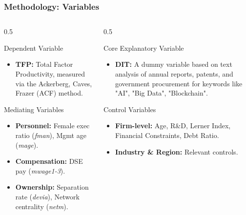 \documentclass[aspectratio=169]{beamer}
\begin{document}
\begin{frame}
  \frametitle{Methodology: Variables}
    \begin{columns}[T]
        \begin{column}{0.5\textwidth}
            \begin{block}{Dependent Variable}
                \begin{itemize}
                    \item \textbf{TFP:} Total Factor Productivity, measured via the Ackerberg, Caves, Frazer (ACF) method.
                \end{itemize}
            \end{block}
            \begin{alertblock}{Mediating Variables}
                \begin{itemize}
                    \item \textbf{Personnel:} Female exec ratio (\textit{fman}), Mgmt age (\textit{mage}).
                    \item \textbf{Compensation:} DSE pay (\textit{mwage1-3}).
                    \item \textbf{Ownership:} Separation rate (\textit{devia}), Network centrality (\textit{netm}).
                \end{itemize}
            \end{alertblock}
        \end{column}
        \begin{column}{0.5\textwidth}
            \begin{block}{Core Explanatory Variable}
                \begin{itemize}
                    \item \textbf{DIT:} A dummy variable based on text analysis of annual reports, patents, and government procurement for keywords like "AI", "Big Data", "Blockchain".
                \end{itemize}
            \end{block}
            \begin{block}{Control Variables}
                \begin{itemize}
                    \item \textbf{Firm-level:} Age, R\&D, Lerner Index, Financial Constraints, Debt Ratio.
                    \item \textbf{Industry & Region:} Relevant controls.
                \end{itemize}
            \end{block}
        \end{column}
    \end{columns}
\end{frame}
\end{document}
